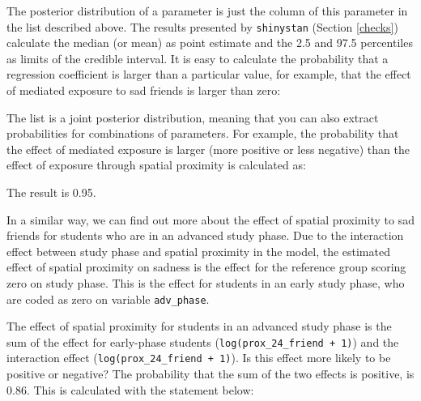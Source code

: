 \documentclass[doc]{apa6}
\newenvironment{Shaded}{\begin{snugshade}}{\end{snugshade}}
\newcommand{\KeywordTok}[1]{\textcolor[rgb]{0.13,0.29,0.53}{\textbf{#1}}}
\newcommand{\DataTypeTok}[1]{\textcolor[rgb]{0.13,0.29,0.53}{#1}}
\newcommand{\DecValTok}[1]{\textcolor[rgb]{0.00,0.00,0.81}{#1}}
\newcommand{\StringTok}[1]{\textcolor[rgb]{0.31,0.60,0.02}{#1}}
\newcommand{\OperatorTok}[1]{\textcolor[rgb]{0.81,0.36,0.00}{\textbf{#1}}}
\newcommand{\NormalTok}[1]{#1}
\begin{document}
The posterior distribution of a parameter is just the column of this
parameter in the list described above. The results presented by
\texttt{shinystan} (Section \ref{checks}) calculate the median (or mean)
as point estimate and the 2.5 and 97.5 percentiles as limits of the
credible interval. It is easy to calculate the probability that a
regression coefficient is larger than a particular value, for example,
that the effect of mediated exposure to sad friends is larger than zero:

\begin{Shaded}
\end{Shaded}

The list is a joint posterior distribution, meaning that you can also
extract probabilities for combinations of parameters. For example, the
probability that the effect of mediated exposure is larger (more
positive or less negative) than the effect of exposure through spatial
proximity is calculated as:

\begin{Shaded}
\end{Shaded}

The result is 0.95.

In a similar way, we can find out more about the effect of spatial
proximity to sad friends for students who are in an advanced study
phase. Due to the interaction effect between study phase and spatial
proximity in the model, the estimated effect of spatial proximity on
sadness is the effect for the reference group scoring zero on study
phase. This is the effect for students in an early study phase, who are
coded as zero on variable \texttt{adv\_phase}.

The effect of spatial proximity for students in an advanced study phase
is the sum of the effect for early-phase students
(\texttt{log(prox\_24\_friend\ +\ 1)}) and the interaction effect
(\texttt{log(prox\_24\_friend\ +\ 1)}). Is this effect more likely to be
positive or negative? The probability that the sum of the two effects is
positive, is 0.86. This is calculated with the statement below:
\end{document}
